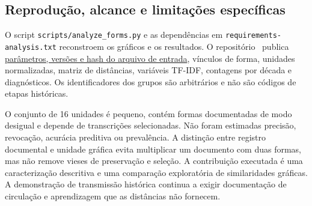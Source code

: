 

\subsection{Reprodução, alcance e limitações específicas}
O script \nolinkurl{scripts/analyze_forms.py} e as dependências em \nolinkurl{requirements-analysis.txt} reconstroem os gráficos e os resultados. O repositório \repo\ publica \href{https://github.com/murilloed/historia-riso-escrito-portugues/blob/main/data/analysis/summary.json}{parâmetros, versões e hash do arquivo de entrada}, vínculos de forma, unidades normalizadas, matriz de distâncias, variáveis TF-IDF, contagens por década e diagnósticos. Os identificadores dos grupos são arbitrários e não são códigos de etapas históricas.

O conjunto de 16 unidades é pequeno, contém formas documentadas de modo desigual e depende de transcrições selecionadas. Não foram estimadas precisão, revocação, acurácia preditiva ou prevalência. A distinção entre registro documental e unidade gráfica evita multiplicar um documento com duas formas, mas não remove vieses de preservação e seleção. A contribuição executada é uma caracterização descritiva e uma comparação exploratória de similaridades gráficas. A demonstração de transmissão histórica continua a exigir documentação de circulação e aprendizagem que as distâncias não fornecem.
\clearpage
